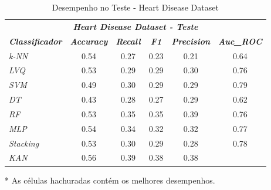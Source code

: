 \documentclass[journal]{IEEEtran}
\begin{document}
\begin{table}[h!]
	\caption{Desempenho no Teste - Heart Disease Dataset}
	\label{tab:24}
	\begin{threeparttable}
		\begin{tabular}{lccccc}
			\hline
			\multicolumn{6}{c}{\textit{\textbf{Heart Disease Dataset - Teste}}}                                                                                                                                  \\
			\multicolumn{1}{l|}{\textit{\textbf{Classificador}}} & \textit{\textbf{Accuracy}} & \textit{\textbf{Recall}}  & \textit{\textbf{F1}}      & \textit{\textbf{Precision}} & \textit{\textbf{Auc\_ROC}} \\ \hline
			\multicolumn{1}{l|}{\textit{k-NN}}                   & 0.54                       & 0.27                      & 0.23                      & 0.21                        & 0.64                       \\
			\multicolumn{1}{l|}{\textit{LVQ}}                    & 0.53                       & 0.29                      & 0.29                      & 0.30                        & 0.76                       \\
			\multicolumn{1}{l|}{\textit{SVM}}                    & 0.49                       & 0.30                      & 0.29                      & 0.29                        & 0.79                       \\
			\multicolumn{1}{l|}{\textit{DT}}                     & 0.43                       & 0.28                      & 0.27                      & 0.29                        & 0.62                       \\
			\multicolumn{1}{l|}{\textit{RF}}                     & 0.53                       & 0.35                      & 0.35                      & 0.39                        & 0.76                       \\
			\multicolumn{1}{l|}{\textit{MLP}}                    & 0.54                       & 0.34                      & 0.32                      & 0.32                        & 0.77                       \\
			\multicolumn{1}{l|}{\textit{Stacking}}               & 0.53                       & 0.30                      & 0.29                      & 0.28                        & \cellcolor{lightgray}0.78  \\
			\multicolumn{1}{l|}{\textit{KAN}}                    & \cellcolor{lightgray}0.56  & \cellcolor{lightgray}0.39 & \cellcolor{lightgray}0.38 & \cellcolor{lightgray}0.38   &                            \\
			\hline
		\end{tabular}
		\begin{tablenotes}\footnotesize
			\item[*] As células hachuradas contém os melhores desempenhos.
		\end{tablenotes}
	\end{threeparttable}
\end{table}
\end{document}
